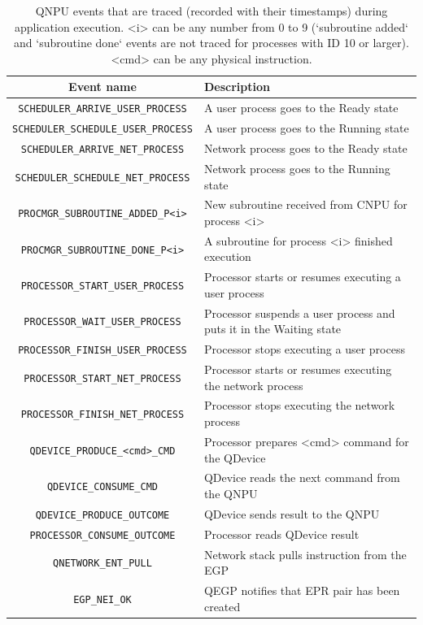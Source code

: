 \begin{table}[htpb]
    \centering
    \begin{tabular}{|c|l|}
    \hline
    \textbf{Event name} & \textbf{Description} \\ 
    \hline
    \texttt{SCHEDULER\_ARRIVE\_USER\_PROCESS} & A user process goes to the Ready state \\
    \texttt{SCHEDULER\_SCHEDULE\_USER\_PROCESS} & A user process goes to the Running state \\
    \texttt{SCHEDULER\_ARRIVE\_NET\_PROCESS} & Network process goes to the Ready state \\
    \texttt{SCHEDULER\_SCHEDULE\_NET\_PROCESS} & Network process goes to the Running state \\
    \texttt{PROCMGR\_SUBROUTINE\_ADDED\_P<i>} & New subroutine received from \ac{CNPU} for process <i> \\
    \texttt{PROCMGR\_SUBROUTINE\_DONE\_P<i>} & A subroutine for process <i> finished execution \\
    \texttt{PROCESSOR\_START\_USER\_PROCESS} & Processor starts or resumes executing a user process \\
    \texttt{PROCESSOR\_WAIT\_USER\_PROCESS} & Processor suspends a user process and puts it in the Waiting state \\
    \texttt{PROCESSOR\_FINISH\_USER\_PROCESS} & Processor stops executing a user process \\
    \texttt{PROCESSOR\_START\_NET\_PROCESS} & Processor starts or resumes executing the network process \\
    \texttt{PROCESSOR\_FINISH\_NET\_PROCESS} & Processor stops executing the network process \\
    \texttt{QDEVICE\_PRODUCE\_<cmd>\_CMD} & Processor prepares <cmd> command for the \ac{QDevice} \\
    \texttt{QDEVICE\_CONSUME\_CMD} & \ac{QDevice} reads the next command from the \ac{QNPU} \\
    \texttt{QDEVICE\_PRODUCE\_OUTCOME} & \ac{QDevice} sends result to the \ac{QNPU} \\
    \texttt{PROCESSOR\_CONSUME\_OUTCOME} & Processor reads \ac{QDevice} result \\
    \texttt{QNETWORK\_ENT\_PULL} & Network stack pulls instruction from the EGP \\
    \texttt{EGP\_NEI\_OK} & QEGP notifies that EPR pair has been created \\
    \hline
    \end{tabular}
    \caption{\ac{QNPU} events that are traced (recorded with their timestamps) during application execution. <i> can be any number from 0 to 9 (`subroutine added` and `subroutine done` events are not traced for processes with ID 10 or larger). <cmd> can be any physical instruction.}
    \label{tab:qnpu_events}
\end{table}

